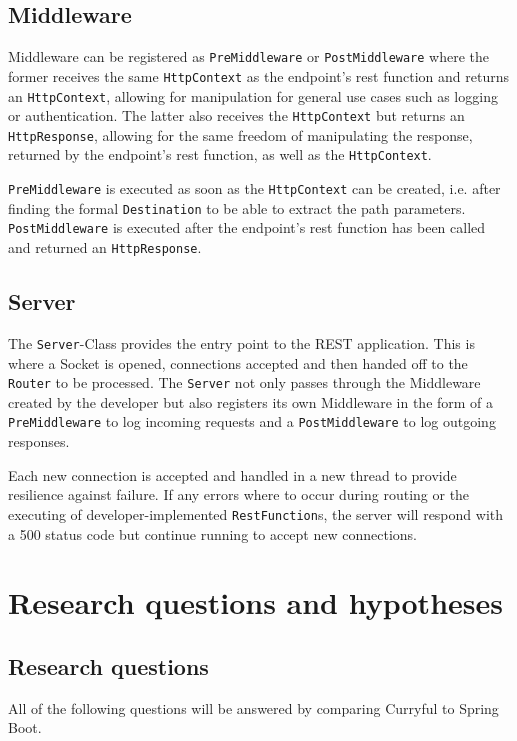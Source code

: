 \documentclass[a4paper]{article}
\begin{document}
\subsection{Middleware}
Middleware can be registered as \verb|PreMiddleware| or \verb|PostMiddleware|
where the former receives the same \verb|HttpContext| as the endpoint's rest
function and returns an \verb|HttpContext|, allowing for manipulation for
general use cases such as logging or authentication. The latter also receives
the \verb|HttpContext| but returns an \verb|HttpResponse|, allowing for the same
freedom of manipulating the response, returned by the endpoint's rest function,
as well as the \verb|HttpContext|.

\verb|PreMiddleware| is executed as soon as the \verb|HttpContext| can be
created, i.e. after finding the formal \verb|Destination| to be able to extract
the path parameters. \verb|PostMiddleware| is executed after the endpoint's rest
function has been called and returned an \verb|HttpResponse|.

\subsection{Server}
The \verb|Server|-Class provides the entry point to the REST application. This
is where a Socket is opened, connections accepted and then handed off to the
\verb|Router| to be processed. The \verb|Server| not only passes through the
Middleware created by the developer but also registers its own Middleware in
the form of a \verb|PreMiddleware| to log incoming requests and a
\verb|PostMiddleware| to log outgoing responses.

Each new connection is accepted and handled in a new thread to provide
resilience against failure. If any errors where to occur during routing or the
executing of developer-implemented \verb|RestFunction|s, the server will respond
with a 500 status code but continue running to accept new connections.

\section{Research questions and hypotheses}
\subsection{Research questions}

All of the following questions will be answered by comparing Curryful to Spring
Boot.
\end{document}
